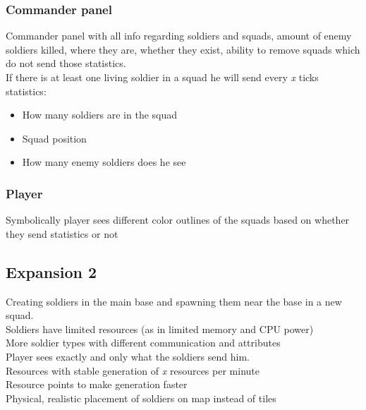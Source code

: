 \documentclass{article}
\begin{document}
\subsubsection{Commander panel}
Commander panel with all info regarding soldiers and squads, amount of enemy soldiers killed, where they are, whether they exist, ability to remove squads which do not send those statistics. \\ 
If there is at least one living soldier in a squad he will send every \textit{x} ticks statistics: 
\begin{itemize}
\item How many soldiers are in the squad 
\item Squad position
\item How many enemy soldiers does he see
\end{itemize} 

\subsubsection{Player}
Symbolically player sees different color outlines of the squads based on whether they send statistics or not

\subsection{Expansion 2}
Creating soldiers in the main base and spawning them near the base in a new squad. \\ 
Soldiers have limited resources (as in limited memory and CPU power) \\ 
More soldier types with different communication and attributes \\ 
Player sees exactly and only what the soldiers send him. \\
Resources with stable generation of \textit{x} resources per minute \\ 
Resource points to make generation faster \\
Physical, realistic placement of soldiers on map instead of tiles \\ 
\end{document}
